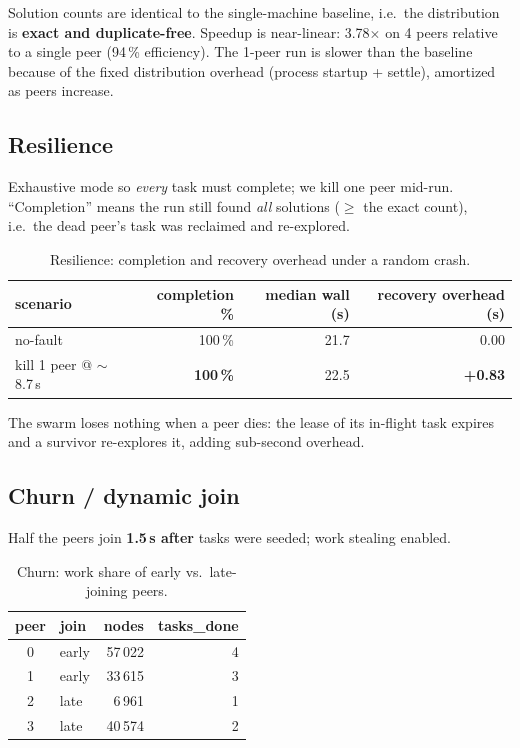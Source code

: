 \documentclass[11pt,a4paper]{article}
\begin{document}
Solution counts are identical to the single-machine baseline, i.e.\ the distribution is
\textbf{exact and duplicate-free}. Speedup is near-linear: 3.78$\times$ on 4 peers relative to a
single peer (94\,\% efficiency). The 1-peer run is slower than the baseline because of the fixed
distribution overhead (process startup + settle), amortized as peers increase.

\subsection{Resilience}
Exhaustive mode so \emph{every} task must complete; we kill one peer mid-run. ``Completion''
means the run still found \emph{all} solutions ($\ge$ the exact count), i.e.\ the dead peer's task
was reclaimed and re-explored.

\begin{table}[htbp]
  \centering
  \caption{Resilience: completion and recovery overhead under a random crash.}
  \small
  \begin{tabular}{@{}l r r r@{}}
    \toprule
    \textbf{scenario} & \textbf{completion \%} & \textbf{median wall (s)} & \textbf{recovery overhead (s)}\\
    \midrule
    no-fault & 100\,\% & 21.7 & 0.00\\
    kill 1 peer @ $\sim$8.7\,s & \textbf{100\,\%} & 22.5 & \textbf{+0.83}\\
    \bottomrule
  \end{tabular}
\end{table}

The swarm loses nothing when a peer dies: the lease of its in-flight task expires and a survivor
re-explores it, adding sub-second overhead.

\subsection{Churn / dynamic join}
Half the peers join \textbf{1.5\,s after} tasks were seeded; work stealing enabled.

\begin{table}[htbp]
  \centering
  \caption{Churn: work share of early vs.\ late-joining peers.}
  \small
  \begin{tabular}{@{}c l r r@{}}
    \toprule
    \textbf{peer} & \textbf{join} & \textbf{nodes} & \textbf{tasks\_done}\\
    \midrule
    0 & early & 57\,022 & 4\\
    1 & early & 33\,615 & 3\\
    2 & late  & 6\,961  & 1\\
    3 & late  & 40\,574 & 2\\
    \bottomrule
  \end{tabular}
\end{table}
\end{document}
